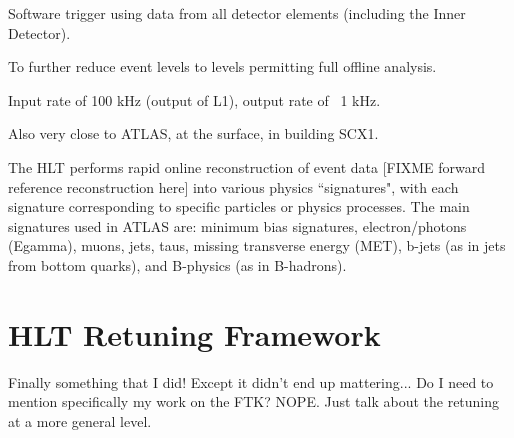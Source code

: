Software trigger using data from all detector elements (including the Inner Detector).

To further reduce event levels to levels permitting full offline analysis.

Input rate of 100 kHz (output of L1), output rate of ~1 kHz.

Also very close to ATLAS, at the surface, in building SCX1. %

The HLT performs rapid online reconstruction of event data [FIXME forward reference reconstruction here] into various physics ``signatures", with each signature corresponding to specific particles or physics processes.
The main signatures used in ATLAS are: minimum bias signatures, electron/photons (Egamma), muons, jets, taus, missing transverse energy (MET), b-jets (as in jets from bottom quarks), and B-physics (as in B-hadrons).
    





\section{HLT Retuning Framework}
Finally something that I did!
Except it didn't end up mattering...
Do I need to mention specifically my work on the FTK? NOPE. Just talk about the retuning at a more general level.

